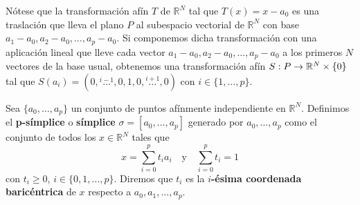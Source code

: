 Nótese que la transformación afín $T$ de $\mathbb{R}^{N}$ tal que
$T(x) = x - a_{0}$ es una traslación que lleva el plano $P$ al subespacio
vectorial de $\mathbb{R}^{N}$ con base
$a_{1}-a_{0}, a_{2}-a_{0}, \ldots, a_{p}-a_{0}$. Si componemos dicha transformación
con una aplicación lineal que lleve cada vector $a_{1}-a_{0}, a_{2}-a_{0}, \ldots
, a_{p}-a_{0}$ a los primeros $N$ vectores de la base usual, obtenemos una
transformación afín $S: P \rightarrow \mathbb{R}^{N}\times \{0\}$ tal que
$S(a_{i}) = (0, \overset{i-1}{\ldots}, 0, 1, 0, \overset{i+1}{\ldots}, 0)$ con
$i \in \{1, \ldots, p\}$.

\begin{definicion}
	\label{def:simplex} Sea $\{a_{0}, \ldots, a_{p}\}$ un conjunto de puntos afínmente
	independiente en $\mathbb{R}^{N}$. Definimos el \textbf{p-símplice} o \textbf{símplice}
	$\sigma = [a_{0}, \ldots, a_{p}]$ generado por $a_{0}, \ldots, a_{p}$ como el
	conjunto de todos los $x \in \mathbb{R}^{N}$ tales que
	\[
	x=\sum_{i=0}^{p}t_{i}a_{i}\quad \text{y}\quad \sum_{i=0}^{p}t_{i}=1
	\]
	con $t_{i}\geq 0$, $i \in \{0, 1, \ldots, p\}$. Diremos que $t_{i}$ es la
	\textbf{$i$-ésima coordenada baricéntrica} de $x$ respecto a $a_{0}, a_{1}, \ldots
	, a_{p}$.
\end{definicion}

